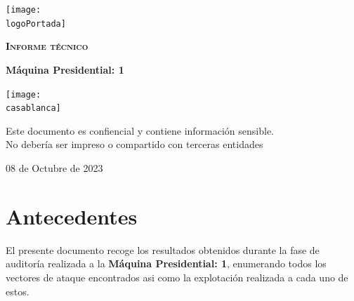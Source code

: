 \documentclass[a4paper]{article}
\newcommand{\logoPortada}{./vuln.png}
\newcommand{\casablanca}{./white.jpg}
\newcommand{\machineName}{Máquina Presidential: 1}
\newcommand{\startDate}{08 de Octubre de 2023}
\begin{document}





  \cfoot{\thepage}          %
    \begin{titlepage}       
        \centering
        \texttt{[image: \\logoPortada]}\par\vspace{1cm}
        {\scshape\LARGE \textbf{Informe  técnico}} \par\vspace{0.4cm}
        {\Huge\textcolor{bluePortada}{\textbf{\machineName}}}\par\vspace{2cm}
        \vfill\vfill
        \texttt{[image: \\casablanca]}
        \vfill

        \begin{tcolorbox}[width=\textwidth,colback=red!5!white,colframe=red!75!black]
            \centering
            Este documento es confiencial y contiene información sensible.\\
            No debería ser impreso o compartido con terceras entidades
        \end{tcolorbox}
        
        \vfill
        {\large \startDate\par}
        \vfill
    \end{titlepage}                                    
    
\clearpage
\tableofcontents
\clearpage


\section{Antecedentes}
El presente documento recoge los resultados obtenidos durante la fase de auditoría realizada a la
\textbf{\machineName}, enumerando todos los vectores de ataque encontrados asi como la explotación 
realizada a cada uno de estos.
\end{document}
